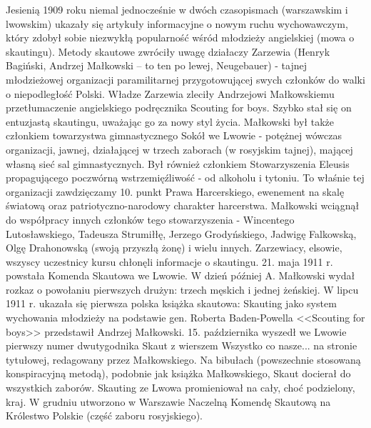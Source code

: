Jesienią 1909 roku niemal jednocześnie w dwóch czasopismach (warszawskim i lwowskim) ukazały się artykuły informacyjne o nowym ruchu wychowawczym, który zdobył sobie niezwykłą popularność wśród młodzieży angielskiej (mowa o skautingu). Metody skautowe zwróciły uwagę działaczy Zarzewia (Henryk Bagiński, Andrzej Małkowski – to ten po lewej, Neugebauer) - tajnej młodzieżowej organizacji paramilitarnej przygotowującej swych członków do walki o niepodległość Polski. Władze Zarzewia zleciły Andrzejowi Małkowskiemu przetłumaczenie angielskiego podręcznika Scouting for boys. Szybko stał się on entuzjastą skautingu, uważając go za nowy styl życia. Małkowski był także członkiem towarzystwa gimnastycznego Sokół we Lwowie - potężnej wówczas organizacji, jawnej, działającej w trzech zaborach (w rosyjskim tajnej), mającej własną sieć sal gimnastycznych. Był również członkiem Stowarzyszenia Eleusis propagującego poczwórną wstrzemięźliwość - od alkoholu  i tytoniu. To właśnie tej organizacji zawdzięczamy 10. punkt Prawa Harcerskiego, ewenement na skalę światową oraz patriotyczno-narodowy charakter harcerstwa. Małkowski wciągnął do współpracy innych członków tego stowarzyszenia - Wincentego Lutosławskiego, Tadeusza Strumiłłę, Jerzego Grodyńskiego, Jadwigę Falkowską, Olgę Drahonowską (swoją przyszłą żonę) i wielu innych. Zarzewiacy, elsowie, wszyscy uczestnicy kursu chłonęli informacje o skautingu. 21. maja 1911 r. powstała Komenda Skautowa we Lwowie. W dzień później A. Małkowski wydał rozkaz o powołaniu pierwszych drużyn: trzech męskich i jednej żeńskiej. W lipcu 1911 r. ukazała się pierwsza polska książka skautowa: Skauting jako system wychowania młodzieży na podstawie gen. Roberta Baden-Powella <<Scouting for boys>> przedstawił Andrzej Małkowski. 15. października wyszedł we Lwowie pierwszy numer dwutygodnika Skaut z wierszem Wszystko co nasze... na stronie tytułowej, redagowany przez Małkowskiego. Na bibułach (powszechnie stosowaną konspiracyjną metodą), podobnie jak książka Małkowskiego, Skaut docierał do wszystkich zaborów. Skauting ze Lwowa promieniował na cały, choć podzielony, kraj. W grudniu utworzono w Warszawie Naczelną Komendę Skautową na Królestwo Polskie (część zaboru rosyjskiego).


